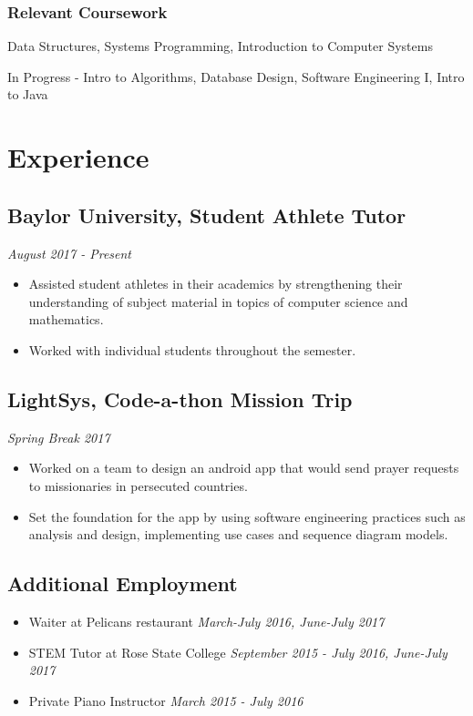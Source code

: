 \documentclass{article}
\begin{document}
\subsubsection{Relevant Coursework}
Data Structures, Systems Programming, Introduction to Computer Systems 

In Progress - Intro to Algorithms, Database Design, Software Engineering I, Intro to Java


\section{Experience}

\subsection{Baylor University, Student Athlete Tutor} 
\hfill\textit{August 2017 - Present}

\begin{itemize}
	\item Assisted student athletes in their academics by strengthening their understanding of subject material in topics of computer science and mathematics.
	
	\item Worked with individual students throughout the semester. 
\end{itemize}

\subsection{LightSys, Code-a-thon Mission Trip}
\hfill
\textit{Spring Break 2017}

\begin{itemize}
	\item Worked on a team to design an android app that would send prayer requests
	to missionaries in persecuted countries. 

	\item Set the foundation for the app by using software engineering practices such as analysis and design, implementing use cases and sequence diagram models.
\end{itemize}
  
\subsection{Additional Employment}
\begin{itemize}
	\item Waiter at Pelicans restaurant \hfill\textit{March-July 2016, June-July 2017} 
	
	\item STEM Tutor at Rose State College \hfill\textit{September 2015 - July 2016, June-July 2017} 
	
	\item Private Piano Instructor \hfill\textit{March 2015 - July 2016}
\end{itemize}
\end{document}
